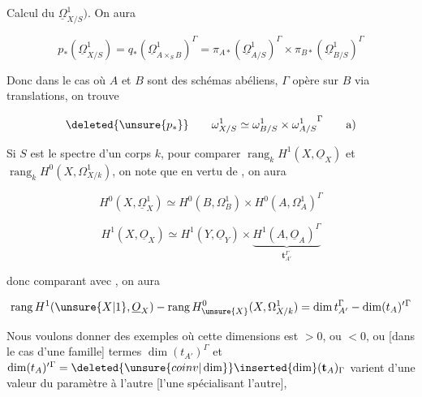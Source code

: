 \makeatletter\tagsleft@true\makeatother
Calcul du  $\underline{\Omega}^{1}_{X/S})$. On aura


\[
p_*(\underline{\Omega}^{1}_{X/S})
=q_*(\underline{\Omega}^{1}_{A\times_S B})^{\Gamma}
=\pi_{A*}(\underline{\Omega}^{1}_{A/S})^{\Gamma}\times\pi_{B*}(\underline{\Omega}^{1}_{B/S})^{\Gamma}
\]

Donc dans le cas  où $A$ et $B$ sont des schémas abéliens,  $\Gamma$ opère sur $B$ via translations, on trouve

\[
\deleted{\unsure{p_*}}\qquad \omega^{1}_{X/S}\simeq\omega^{1}_{B/S}\times{\omega^{1}_{A/S}}^{\Gamma}
\tag*{a)}
\]

Si $S$ est le spectre d'un corps $k$, pour comparer $\operatorname{rang}_k H^1(X,\underline{O}_X)$ et $\operatorname{rang}_k H^0(X,\Omega^1_{X/k})$, on note  que en vertu de , on aura

\[
H^0(X,\underline{\Omega}^1_X)\simeq H^0(B,\Omega^1_B)\times H^0(A,\Omega^1_A)^\Gamma
\tag*{a$'$)}
\]

\[
H^1(X,\underline{O}_X)\simeq H^1(Y,\underline{O}_Y)\times\underbrace{H^1(A,\underline{O}_A)^\Gamma}_{\mathbf{t}_{A'}^\Gamma}
\tag*{b$'$)}
\]

donc comparant avec , on aura

\[
\operatorname{rang} H^1(\unsure{X|1},\underline{O}_X)-\operatorname{rang} H^0_{\unsure{X}}(X,\Omega^1_{X/k})=\dim t_{A'}^\Gamma-\dim(t_A)'{}^\Gamma
\]

Nous voulons donner des exemples où cette  dimensions est $>0$, ou $<0$,  ou [dans le cas d'une famille]  termes  $\dim(t_{A'})^\Gamma$ et $\dim(t_A)'{}^\Gamma=\deleted{\unsure{coinv|\dim}}\inserted{\dim}(\mathbf{t}_A)_\Gamma$ varient d'une valeur du paramètre à l'autre \deleted{[\unsure{pour un}} [l'une spécialisant l'autre],


